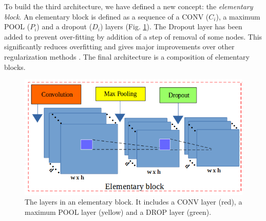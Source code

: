 \documentclass[review]{elsarticle}
\begin{document}
To build the third architecture, we have defined a new concept: the \textit{elementary block}. An {elementary block} is defined as a sequence of a CONV ($C_{i}$), a maximum POOL ($P_i$) and a dropout ($D_i$) layers (Fig. \ref{figelementary}). The Dropout layer has been added to prevent over-fitting by addition of a step of removal of some nodes. This significantly reduces overfitting and gives major improvements over other regularization methods \cite{srivastava2014dropout}. The final architecture is a composition of elementary blocks. 
\begin{figure}[h]
	\centering
	\includegraphics[scale=0.4]{images/elementary_block}
	\caption{The layers in an elementary block. It includes a CONV layer (red), a maximum POOL layer (yellow) and a DROP layer (green).}
	\label{figelementary}
\end{figure}
\end{document}
